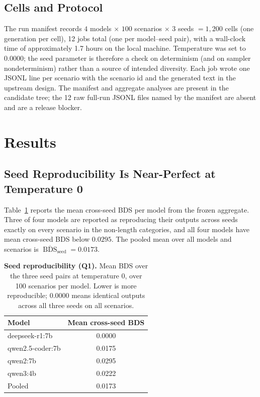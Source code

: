 \documentclass[11pt]{article}
\DeclareMathOperator{\BDS}{BDS}
\begin{document}
\subsection{Cells and Protocol}

The run manifest records $4$ models $\times$ $100$ scenarios $\times$ $3$
seeds $= 1{,}200$ cells (one generation per cell), 12 jobs total (one per
model--seed pair), with a wall-clock time of approximately 1.7 hours on the
local machine.
Temperature was set to 0.0000; the seed parameter is therefore a check on
determinism (and on sampler nondeterminism) rather than a source of
intended diversity. Each job wrote one JSONL line per scenario with the
scenario id and the generated text in the upstream design. The manifest and
aggregate analyses are present in the candidate tree; the 12 raw full-run
JSONL files named by the manifest are absent and are a release blocker.

\section{Results}
\label{sec:results}

\subsection{Seed Reproducibility Is Near-Perfect at Temperature 0}

Table~\ref{tab:repro} reports the mean cross-seed BDS per model from the
frozen aggregate. Three of four models are reported as reproducing their
outputs across seeds exactly on every scenario in the non-length categories,
and all four models have mean cross-seed BDS below $0.0295$. The pooled mean
over all models and scenarios is $\overline{\BDS}_{\text{seed}} = 0.0173$.

\begin{table}[ht]
\centering
\caption{\textbf{Seed reproducibility (Q1).} Mean BDS over the three seed
pairs at temperature 0, over 100 scenarios per model. Lower is more
reproducible; 0.0000 means identical outputs across all three seeds on all
scenarios.}
\label{tab:repro}
\begin{tabular}{@{}lc@{}}
\toprule
Model & Mean cross-seed BDS \\
\midrule
deepseek-r1:7b    & 0.0000 \\
qwen2.5-coder:7b  & 0.0175 \\
qwen2:7b          & 0.0295 \\
qwen3:4b          & 0.0222 \\
\midrule
Pooled            & 0.0173 \\
\bottomrule
\end{tabular}
\end{table}
\end{document}
